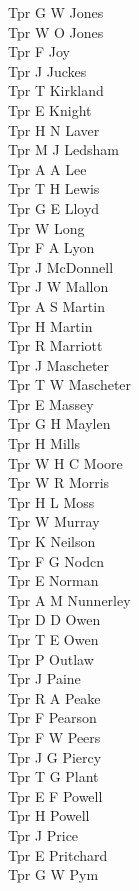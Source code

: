 \begin{multicols}{3}
  Tpr G W Jones \\
  Tpr W O Jones \\
  Tpr F Joy \\
  Tpr J Juckes \\
  Tpr T Kirkland \\
  Tpr E Knight \\
  Tpr H N Laver \\
  Tpr M J Ledsham \\
  Tpr A A Lee \\
  Tpr T H Lewis \\
  Tpr G E Lloyd \\
  Tpr W Long \\
  Tpr F A Lyon \\
  Tpr J McDonnell \\
  Tpr J W Mallon \\
  Tpr A S Martin \\
  Tpr H Martin \\
  Tpr R Marriott \\
  Tpr J Mascheter \\
  Tpr T W Mascheter \\
  Tpr E Massey \\
  Tpr G H Maylen \\
  Tpr H Mills \\
  Tpr W H C Moore \\
  Tpr W R Morris \\
  Tpr H L Moss \\
  Tpr W Murray \\
  Tpr K Neilson \\
  Tpr F G Nodcn \\
  Tpr E Norman \\
  Tpr A M Nunnerley \\
  Tpr D D Owen \\
  Tpr T E Owen \\
  Tpr P Outlaw \\
  Tpr J Paine \\
  Tpr R A Peake \\
  Tpr F Pearson \\
  Tpr F W Peers \\
  Tpr J G Piercy \\
  Tpr T G Plant \\
  Tpr E F Powell \\
  Tpr H Powell \\
  Tpr J Price \\
  Tpr E Pritchard \\
  Tpr G W Pym \\

\end{multicols}
